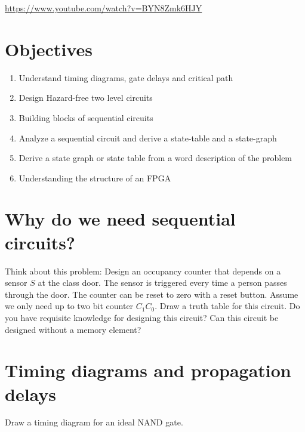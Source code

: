 
\url{https://www.youtube.com/watch?v=BYN8Zmk6HJY}



\section{Objectives}
\begin{enumerate}
  \item Understand timing diagrams, gate delays and critical path
  \item Design Hazard-free two level circuits
  \item Building blocks of sequential circuits
  \item Analyze a sequential circuit and derive a state-table and a state-graph
  \item Derive a state graph or state table from a word description of the problem
  \item Understanding the structure of an FPGA
\end{enumerate}

\section{Why do we need sequential circuits?}

\begin{example}
  Think about this problem: Design an occupancy counter that depends on a
  sensor $S$ at the class door. The sensor is triggered every time a person passes
  through the door. The counter can be reset to zero with a reset button. Assume
  we only need up to two bit counter $C_1C_0$. Draw a truth table for this
  circuit. Do you have requisite knowledge for designing this circuit? Can this
  circuit be designed without a memory element?
\end{example}
\vspace{10em}


\section{Timing diagrams and propagation delays}

\begin{example}
  Draw a timing diagram for an ideal NAND gate.
\end{example}
\vspace{20em}

